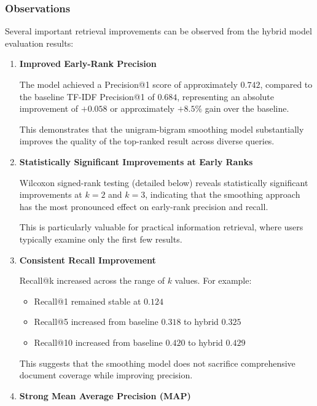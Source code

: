 \vspace{0.2cm}

\subsubsection{Observations}

Several important retrieval improvements can be observed from the hybrid model evaluation results:

\begin{enumerate}
    \item \textbf{Improved Early-Rank Precision}
    
    The model achieved a Precision@1 score of approximately $0.742$, compared to the baseline TF-IDF Precision@1 of $0.684$, representing an absolute improvement of $+0.058$ or approximately $+8.5\%$ gain over the baseline.
    
    This demonstrates that the unigram-bigram smoothing model substantially improves the quality of the top-ranked result across diverse queries.
    
    \item \textbf{Statistically Significant Improvements at Early Ranks}
    
    Wilcoxon signed-rank testing (detailed below) reveals statistically significant improvements at $k=2$ and $k=3$, indicating that the smoothing approach has the most pronounced effect on early-rank precision and recall.
    
    This is particularly valuable for practical information retrieval, where users typically examine only the first few results.
    
    \item \textbf{Consistent Recall Improvement}
    
    Recall@k increased across the range of $k$ values. For example:
    \begin{itemize}
        \item Recall@1 remained stable at $0.124$
        \item Recall@5 increased from baseline $0.318$ to hybrid $0.325$ 
        \item Recall@10 increased from baseline $0.420$ to hybrid $0.429$
    \end{itemize}
    
    This suggests that the smoothing model does not sacrifice comprehensive document coverage while improving precision.
    
    \item \textbf{Strong Mean Average Precision (MAP)}
    

\end{enumerate}
